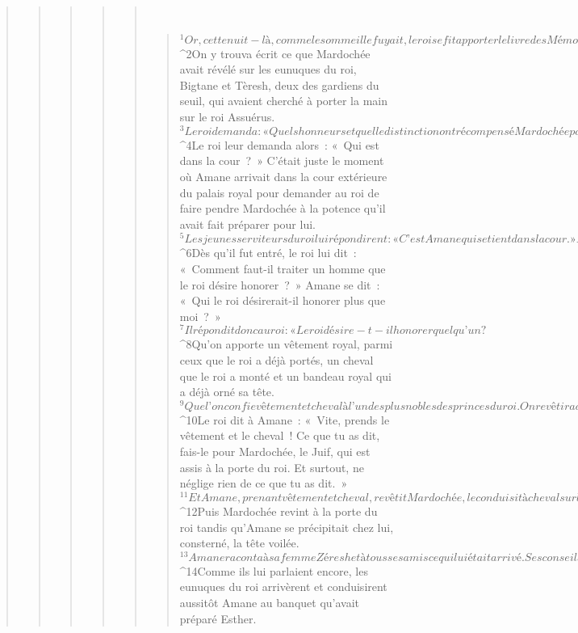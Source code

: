 \begin{verse}
\begin{verse}
\begin{verse}
\begin{verse}
\begin{verse}
         
      \bchapter{}
      \begin{verse}
${}^{1}Or, cette nuit-là, comme le sommeil le fuyait, le roi se fit apporter le livre des Mémoires, les Chroniques, pour s’en faire donner lecture. 
${}^{2}On y trouva écrit ce que Mardochée avait révélé sur les eunuques du roi, Bigtane et Tèresh, deux des gardiens du seuil, qui avaient cherché à porter la main sur le roi Assuérus. 
${}^{3}Le roi demanda : « Quels honneurs et quelle distinction ont récompensé Mardochée pour cette révélation ? » Les jeunes serviteurs du roi lui dirent : « Rien n’a été fait pour le récompenser. » 
${}^{4}Le roi leur demanda alors : « Qui est dans la cour ? » C’était juste le moment où Amane arrivait dans la cour extérieure du palais royal pour demander au roi de faire pendre Mardochée à la potence qu’il avait fait préparer pour lui. 
${}^{5}Les jeunes serviteurs du roi lui répondirent : « C’est Amane qui se tient dans la cour. » Le roi ordonna : « Qu’il entre ! » 
${}^{6}Dès qu’il fut entré, le roi lui dit : « Comment faut-il traiter un homme que le roi désire honorer ? » Amane se dit : « Qui le roi désirerait-il honorer plus que moi ? » 
${}^{7}Il répondit donc au roi : « Le roi désire-t-il honorer quelqu’un ? 
${}^{8}Qu’on apporte un vêtement royal, parmi ceux que le roi a déjà portés, un cheval que le roi a monté et un bandeau royal qui a déjà orné sa tête. 
${}^{9}Que l’on confie vêtement et cheval à l’un des plus nobles des princes du roi. On revêtira alors l’homme que le roi désire honorer, on le conduira à cheval sur la place de la ville, et devant lui on criera : “Voilà comment on traite l’homme que le roi désire honorer !” »
${}^{10}Le roi dit à Amane : « Vite, prends le vêtement et le cheval ! Ce que tu as dit, fais-le pour Mardochée, le Juif, qui est assis à la porte du roi. Et surtout, ne néglige rien de ce que tu as dit. » 
${}^{11}Et Amane, prenant vêtement et cheval, revêtit Mardochée, le conduisit à cheval sur la place de la ville, en criant devant lui : « Voilà comment on traite l’homme que le roi désire honorer ! »
${}^{12}Puis Mardochée revint à la porte du roi tandis qu’Amane se précipitait chez lui, consterné, la tête voilée. 
${}^{13}Amane raconta à sa femme Zéresh et à tous ses amis ce qui lui était arrivé. Ses conseillers et sa femme lui dirent : « Ce Mardochée, devant qui tu commences à capituler, s’il appartient bien à la race des Juifs, tu ne pourras rien contre lui, tu capituleras totalement devant lui. »
${}^{14}Comme ils lui parlaient encore, les eunuques du roi arrivèrent et conduisirent aussitôt Amane au banquet qu’avait préparé Esther.
      

\end{verse}
\end{verse}
\end{verse}
\end{verse}
\end{verse}
\end{verse}
